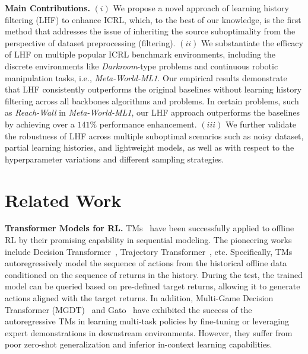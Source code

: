 \documentclass{article}
\begin{document}
\textbf{Main Contributions.} $(i)$ We propose a novel approach of learning history filtering (LHF) to enhance ICRL, which, to the best of our knowledge, is the first method that addresses the issue of inheriting the source suboptimality from the perspective of dataset preprocessing (filtering).
%
$(ii)$ We substantiate the efficacy of LHF on multiple popular ICRL benchmark environments, including the discrete environments like \textit{Darkroom}-type problems and continuous robotic manipulation tasks, i.e., \textit{Meta-World-ML1}.
%
Our empirical results demonstrate that LHF consistently outperforms the original baselines without learning history filtering across all backbones algorithms and problems. In certain problems, such as \textit{Reach-Wall} in \textit{Meta-World-ML1}, our LHF approach outperforms the baselines by achieving over a $141\%$ performance enhancement.
%
$(iii)$ We further validate the robustness of LHF across multiple suboptimal scenarios such as noisy dataset, partial learning histories, and lightweight models, as well as with respect to the hyperparameter variations and different sampling strategies.











%
%
\section{Related Work}
\label{section_related_work}


\textbf{Transformer Models for RL.}
%
TMs~\citep{vaswani2017attention} have been successfully applied to offline RL by their promising capability in sequential modeling. The pioneering works include Decision Transformer~\cite{chen2021decision}, Trajectory Transformer~\cite{janner2021offline}, etc. Specifically, TMs autoregressively model the sequence of actions from the historical offline data conditioned on the sequence of returns in the history.
%
%
During the test, the trained model can be queried based on pre-defined target returns, allowing it to generate actions aligned with the target returns.
%
%
In addition, Multi-Game Decision Transformer (MGDT)~\citep{lee2022multi} and Gato~\citep{reed2022generalist} have exhibited the success of the autoregressive TMs in learning multi-task policies by fine-tuning or leveraging expert demonstrations in downstream environments. However, they suffer from poor zero-shot generalization and inferior in-context learning capabilities.
\end{document}

